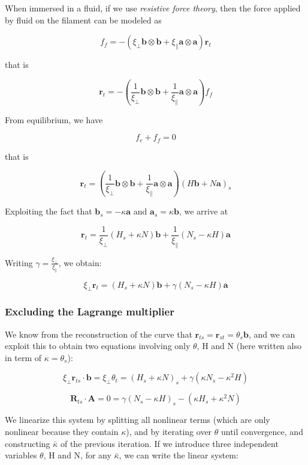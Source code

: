 \label{sec:resist-force-theory}



When immersed in a fluid, if we use \emph{resistive force theory},
then the force applied by fluid on the filament can be modeled as

\[f_f = -( \xi_\perp \mathbf{b}\otimes \mathbf{b} +\xi_\parallel \mathbf{a}\otimes \mathbf{a}) \mathbf{r}_t\]

that is

\[\mathbf{r}_t = -\left( \frac{1}{\xi_\perp}  \mathbf{b}\otimes \mathbf{b} + \frac{1}{\xi_\parallel} \mathbf{a}\otimes \mathbf{a}\right) f_f\]

From equilibrium, we have

\[f_e+f_f = 0\]

that is

\[\mathbf{r}_t = \left( \frac{1}{\xi_\perp}  
\mathbf{b}\otimes \mathbf{b}  + \frac{1}{\xi_\parallel} \mathbf{a}\otimes \mathbf{a}\right) (H\mathbf{b} + N \mathbf{a})_s\]

Exploiting the fact that \(\mathbf{b}_s = - \kappa \mathbf{a}\) and \(\mathbf{a}_s = \kappa \mathbf{b}\), we
arrive at

\[\mathbf{r}_t =  \frac{1}{\xi_\perp} (H_s + \kappa N) \mathbf{b} + \frac{1}{\xi_\parallel}(N_s - \kappa H) \mathbf{a}\]

Writing $\gamma = \frac{\xi_\perp}{\xi_\parallel}$, we obtain:

\[\xi_\perp \mathbf{r}_t =   (H_s + \kappa N) \mathbf{b} + \gamma (N_s - \kappa H) \mathbf{a}\]

\subsubsection{Excluding the Lagrange multiplier}\label{differential-derivation}

We know from the reconstruction of the curve that
\(\mathbf{r}_{ts} = \mathbf{r}_{st} = \theta_s \mathbf{b}\),
and we can exploit this to obtain two equations involving only
\(\theta\),
H
and N (here written also in term of $\kappa = \theta_s$):

\[ \xi_\perp \mathbf{r}_{ts}\cdot \mathbf{b} =\xi_\perp \theta_t =   (H_s + \kappa N)_s + \gamma (\kappa N_s - \kappa^2 H)\]

\[\mathbf{R}_{ts}\cdot \mathbf{A} = 0 =  \gamma(N_s - \kappa H)_s - (\kappa H_s + \kappa^2 N) \]

We linearize this system by splitting all nonlinear terms (which are
only nonlinear because they contain \(\kappa\)), and by iterating over
\(\theta\) until convergence, and constructing \(\bar\kappa\) of the
previous iteration. If we introduce three independent variables
\(\theta\), H and N, for any \(\bar\kappa\), we can write
the linear system:

